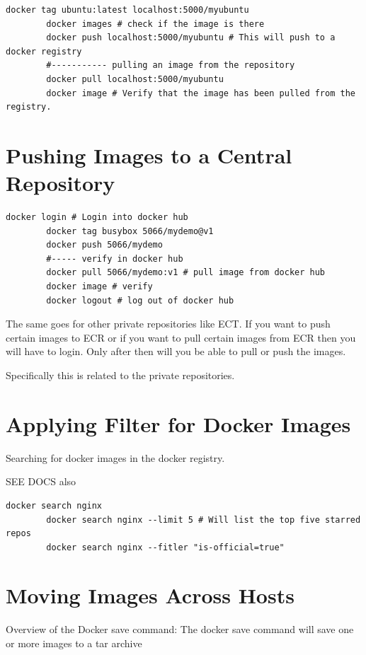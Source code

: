 \documentclass[11pt]{book}
\begin{document}
    \begin{lstlisting}[style=terminal]
        docker tag ubuntu:latest localhost:5000/myubuntu
        docker images # check if the image is there
        docker push localhost:5000/myubuntu # This will push to a docker registry
        #----------- pulling an image from the repository
        docker pull localhost:5000/myubuntu
        docker image # Verify that the image has been pulled from the registry.
    \end{lstlisting}

    \section{Pushing Images to a Central Repository}

    \begin{lstlisting}[style=terminal]
        docker login # Login into docker hub
        docker tag busybox 5066/mydemo@v1
        docker push 5066/mydemo
        #----- verify in docker hub
        docker pull 5066/mydemo:v1 # pull image from docker hub
        docker image # verify
        docker logout # log out of docker hub
    \end{lstlisting}

    The same goes for other private repositories like ECT.
    If you want to push certain images to ECR or if you want to pull certain images from ECR then you will have to login.
    Only after then will you be able to pull or push the images.

    Specifically this is related to the private repositories.


    \section{Applying Filter for Docker Images}
    Searching for docker images in the docker registry.

    SEE DOCS also

    \begin{lstlisting}[style=terminal]
        docker search nginx
        docker search nginx --limit 5 # Will list the top five starred repos
        docker search nginx --fitler "is-official=true"
    \end{lstlisting}

    \section{Moving Images Across Hosts}
    Overview of the Docker save command:
    The docker save command will save one or more images to a tar archive
\end{document}
